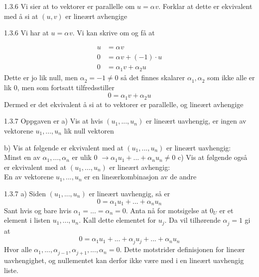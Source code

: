 \documentclass[a4paper,norsk]{article}
\begin{document}
\begin{oppgavebox}{1.3.6}{}
Vi sier at to vektorer er parallelle om $ u = \alpha_{}^{} v $. Forklar at dette er ekvivalent med å si at $ \left( u, v \right) $ er lineært avhengige
\end{oppgavebox}

\begin{proofbox}{1.3.6}{}
 Vi har at $ u = \alpha_{}^{} v $. Vi kan skrive om og få at 

\begin{align*}
    u &= \alpha_{}^{} v\\
    0 &= \alpha_{ }^{} v + \left( -1 \right) \cdot u \\
    0 &= \alpha_{1}^{} v + \alpha_{2}^{} u
\end{align*}
Dette er jo lik null, men $ \alpha_{2}^{} = -1 \neq 0 $ så det finnes skalarer $ \alpha_{1}^{}, \alpha_{2}^{}  $ som ikke alle er lik 0, men som fortsatt tilfredsstiller
\[
    0 = \alpha_{1}^{} v + \alpha_{2}^{} u
\]
Dermed er det ekvivalent å si at to vektorer er parallelle, og lineært avhengige
\end{proofbox}

\begin{oppgavebox}{1.3.7}{}
Oppgaven er
a) Vis at hvis $ \left( u_1, ..., u_n \right)  $ er lineært uavhengig, er ingen av vektorene $ u_1, ..., u_n $ lik null vektoren

b) Vis at følgende er ekvivalent med at $ \left( u_1, ..., u_n \right)  $ er lineært uavhengig: \\

Minst en av $ \alpha_{1}^{} , ..., \alpha_{n}^{}  $ er ulik 0 $ \rightarrow \alpha_{1}^{} u_1 + ... + \alpha_{n}^{} u_n \neq 0$   
c) Vis at følgende også er ekvivalent med at $ \left( u_1, ..., u_n \right)  $ er lineært avhengig:\\

En av vektorene  $ u_1, ..., u_n $ er en lineærkombinasjon av de andre
\end{oppgavebox}

\begin{proofbox}{1.3.7 a)}{}
Siden $ \left(  u_1, ..., u_n \right)  $ er lineært uavhengig, så er 
\[
    0 = \alpha_{1}^{} u_1 + ... + \alpha_{n}^{} u_n
\]
Sant hvis og bare hvis $ \alpha_{1}^{} = ... = \alpha_{n}^{} =0 $. Anta nå for motsigelse at $ 0_U $ er et element i listen $ u_1, ..., u_n $. Kall dette elementet for $ u_j $. Da vil tilhørende $ \alpha_{j}^{} = 1 $ gi at 
\[
    0 = \alpha_{1}^{} u_1 + ... + \alpha_{j}^{} u_j + ... + \alpha_{n}^{} u_n
\]
Hvor alle $ \alpha_{1}^{} , ..., \alpha_{j-1}^{} , \alpha_{j+1}^{} , ..., \alpha_{n}^{}   = 0$. Dette motstrider definisjonen for lineær uavhengighet, og nullementet kan derfor ikke være med i en lineært uavhengig liste.  
\end{proofbox}
\end{document}
